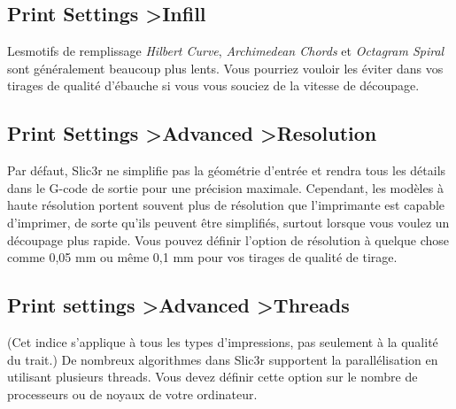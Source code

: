 \subsection{Print Settings \textgreater Infill}

Lesmotifs de remplissage \textit{Hilbert Curve}, \textit{Archimedean Chords} et \textit{Octagram Spiral} sont généralement beaucoup plus lents. Vous pourriez vouloir les éviter dans vos tirages de qualité d'ébauche si vous vous souciez de la vitesse de découpage.

\subsection{Print Settings \textgreater Advanced \textgreater Resolution}

Par défaut, Slic3r ne simplifie pas la géométrie d'entrée et rendra tous les détails dans le G-code de sortie pour une précision maximale. Cependant, les modèles à haute résolution portent souvent plus de résolution que l'imprimante est capable d'imprimer, de sorte qu'ils peuvent être simplifiés, surtout lorsque vous voulez un découpage plus rapide. Vous pouvez définir l'option de résolution à quelque chose comme 0,05 mm ou même 0,1 mm pour vos tirages de qualité de tirage.

\subsection{Print settings \textgreater Advanced \textgreater Threads}

(Cet indice s'applique à tous les types d'impressions, pas seulement à la qualité du trait.) De nombreux algorithmes dans Slic3r supportent la parallélisation en utilisant plusieurs threads. Vous devez définir cette option sur le nombre de processeurs ou de noyaux de votre ordinateur.
